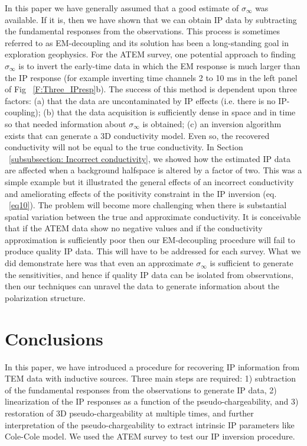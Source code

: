 \documentclass[extra,mreferee]{gji}
\newcommand{\siginf}{\sigma_\infty}
\begin{document}
In this paper we have generally assumed that a good estimate of $\siginf$ was available. If it is, then we have shown that we can obtain IP data by subtracting the fundamental responses from the observations. This process is sometimes referred to as EM-decoupling and its solution has been a long-standing goal in exploration geophysics. For the ATEM survey, one potential approach to finding $\siginf$ is to invert the early-time data in which the EM response is much larger than the IP response (for example inverting time channels 2 to 10 ms in the left panel of Fig ~\ref{F:Three_IPresp}b). The success of this method is dependent upon three factors: (a) that the data are uncontaminated by IP effects (i.e. there is no IP-coupling); (b) that the data acquisition is sufficiently dense in space and in time so that needed information about $\siginf$ is obtained; (c) an inversion algorithm exists that can generate a 3D conductivity model. Even so, the recovered conductivity will not be equal to the true conductivity. In Section ~\ref{subsubsection: Incorrect conductivity}, we showed how the estimated IP data are affected when a background halfspace is altered by a factor of two. This was a simple example but it illustrated the general effects of an incorrect conductivity and ameliorating effects of the positivity constraint in the IP inversion (eq. ~\ref{eq10}). The problem will become more challenging when there is substantial spatial variation between the true and approximate conductivity. It is conceivable that if the ATEM data show no negative values and if the conductivity approximation is sufficiently poor then our EM-decoupling procedure will fail to produce quality IP data. This will have to be addressed for each survey. What we did demonstrate here was that even an approximate $\siginf$ is sufficient to generate the sensitivities, and hence if quality IP data can be isolated from observations, then our techniques can unravel the data to generate information about the polarization structure.

\section{Conclusions}
In this paper, we have introduced a procedure for recovering IP information from TEM data with inductive sources. Three main steps are required: 1) subtraction of the fundamental responses from the observations to generate IP data, 2) linearization of the IP responses as a function of the pseudo-chargeability, and 3) restoration of 3D pseudo-chargeability at multiple times, and further interpretation of the pseudo-chargeability to extract intrinsic IP parameters like Cole-Cole model. We used the ATEM survey to test our IP inversion procedure.
\end{document}
